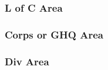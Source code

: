 \documentclass[noraggedright]{turabian-researchpaper}
\begin{document}
		\subsubsection{L of C Area}


			
			

		\subsubsection{Corps or GHQ Area}




		\subsubsection{Div Area}
			

	
\end{document}
